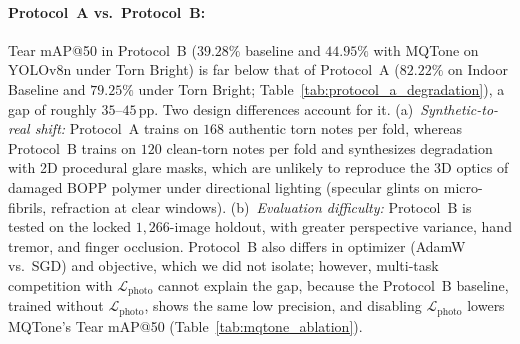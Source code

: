 \documentclass[final,5p,times,twocolumn,authoryear]{elsarticle}
\begin{document}
\paragraph{Protocol~A vs.\ Protocol~B:}
Tear mAP@50 in Protocol~B ($39.28\%$ baseline and $44.95\%$ with MQTone on YOLOv8n under Torn Bright) is far below that of Protocol~A ($82.22\%$ on Indoor Baseline and $79.25\%$ under Torn Bright; Table~\ref{tab:protocol_a_degradation}), a gap of roughly $35$--$45$\,pp. Two design differences account for it. (a)~\emph{Synthetic-to-real shift:} Protocol~A trains on $168$ authentic torn notes per fold, whereas Protocol~B trains on $120$ clean-torn notes per fold and synthesizes degradation with 2D procedural glare masks, which are unlikely to reproduce the 3D optics of damaged BOPP polymer under directional lighting (specular glints on micro-fibrils, refraction at clear windows). (b)~\emph{Evaluation difficulty:} Protocol~B is tested on the locked $1{,}266$-image holdout, with greater perspective variance, hand tremor, and finger occlusion. Protocol~B also differs in optimizer (AdamW vs.\ SGD) and objective, which we did not isolate; however, multi-task competition with $\mathcal{L}_{\text{photo}}$ cannot explain the gap, because the Protocol~B baseline, trained without $\mathcal{L}_{\text{photo}}$, shows the same low precision, and disabling $\mathcal{L}_{\text{photo}}$ lowers MQTone's Tear mAP@50 (Table~\ref{tab:mqtone_ablation}).
\end{document}
